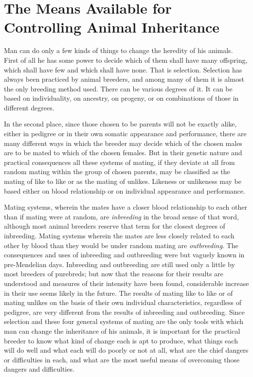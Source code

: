 \chapter[Means for Controlling Animal Inheritance]{The Means Available for Controlling Animal Inheritance}
\label{cha:controlling-animal-inheritance}

Man can do only a few kinds of things to change the heredity of his
animals. First of all he has some power to decide which of them shall
have many offspring, which shall have few and which shall have none.
That is selection. Selection has always been practiced by animal breeders,
and among many of them it is almost the only breeding method
used. There can be various degrees of it. It can be based on individuality,
on ancestry, on progeny, or on combinations of those in different
degrees.

In the second place, since those chosen to be parents will not be
exactly alike, either in pedigree or in their own somatic appearance and
performance, there are many different ways in which the breeder may
decide which of the chosen males are to be mated to which of the chosen
females. But in their genetic nature and practical consequences all
these systems of mating, if they deviate at all from random mating within
the group of chosen parents, may be classified as the mating of like to
like or as the mating of unlikes. Likeness or unlikeness may be based
either on blood relationship or on individual appearance and performance.

Mating systems, wherein the mates have a closer blood relationship
to each other than if mating were at random, are \textit{inbreeding} in the
broad sense of that word, although most animal breeders reserve that
term for the closest degrees of inbreeding. Mating systems wherein the
mates are less closely related to each other by blood than they would be
under random mating are \textit{outbreeding}. The consequences and uses of
inbreeding and outbreeding were but vaguely known in pre-Mendelian
days. Inbreeding and outbreeding are still used only a little by most
breeders of purebreds; but now that the reasons for their results are
understood and measures of their intensity have been found, considerable
increase in their use seems likely in the future. The results of mating
like to like or of mating unlikes on the basis of their own individual
characteristics, regardless of pedigree, are very different from the results
of inbreeding and outbreeding. Since selection and these four general
systems of mating are the only tools with which man can change the
inheritance of his animals, it is important for the practical breeder to
know what kind of change each is apt to produce, what things each will
do well and what each will do poorly or not at all, what are the chief
dangers or difficulties in each, and what are the most useful means of
overcoming those dangers and difficulties.

